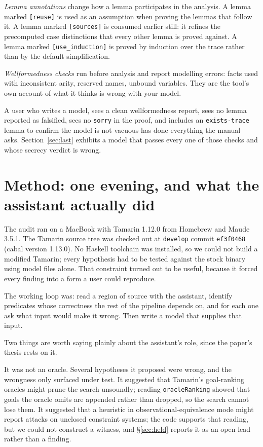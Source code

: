 \documentclass[version=preprint]{iacrcc}
\newcommand{\code}[1]{\texttt{\small #1}}
\theoremstyle{definition}
\theoremstyle{remark}
\begin{document}
\emph{Lemma annotations} change how a lemma participates in the analysis. A
lemma marked \code{[reuse]} is used as an assumption when proving the lemmas
that follow it. A lemma marked \code{[sources]} is consumed earlier still: it
refines the precomputed case distinctions that every other lemma is proved
against. A lemma marked \code{[use\_induction]} is proved by induction over the
trace rather than by the default simplification.

\emph{Wellformedness checks} run before analysis and report modelling errors:
facts used with inconsistent arity, reserved names, unbound variables. They are
the tool's own account of what it thinks is wrong with your model.

A user who writes a model, sees a clean wellformedness report, sees no lemma
reported as falsified, sees no \code{sorry} in the proof, and includes an
\code{exists-trace} lemma to confirm the model is not vacuous has done
everything the manual~\cite{TamarinManual} asks. Section~\ref{sec:last} exhibits a model that passes
every one of those checks and whose secrecy verdict is wrong.

\section{Method: one evening, and what the assistant actually did}\label{sec:method}

The audit ran on a MacBook with Tamarin 1.12.0 from Homebrew and Maude 3.5.1.
The Tamarin source tree was checked out at \code{develop} commit
\code{ef3f0468} (cabal version 1.13.0). No Haskell toolchain was installed, so
we could not build a modified Tamarin; every hypothesis had to be tested
against the stock binary using model files alone. That constraint turned out to
be useful, because it forced every finding into a form a user could reproduce.

The working loop was: read a region of source with the assistant, identify
predicates whose correctness the rest of the pipeline depends on, and for each
one ask what input would make it wrong. Then write a model that supplies that
input.

Two things are worth saying plainly about the assistant's role, since the
paper's thesis rests on it.

It was not an oracle. Several hypotheses it proposed were wrong, and the
wrongness only surfaced under test. It suggested that Tamarin's goal-ranking
oracles might prune the search unsoundly; reading \code{oracleRanking} showed
that goals the oracle omits are appended rather than dropped, so the search
cannot lose them. It suggested that a heuristic in observational-equivalence
mode might report attacks on unclosed constraint systems; the code supports
that reading, but we could not construct a witness, and \S\ref{sec:held}
reports it as an open lead rather than a finding.
\end{document}
